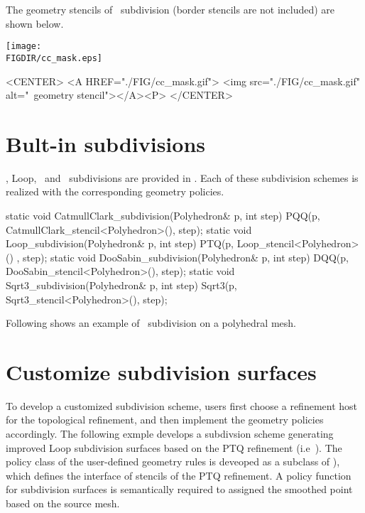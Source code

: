 The geometry stencils of \CC\ subdivision (border stencils are 
not included) are shown below. 

\begin{ccTexOnly}
  \begin{center}
    \parbox{0.4\textwidth}{%
      \texttt{[image: \\FIGDIR/cc\_mask.eps]}%
    }
  \end{center}
\end{ccTexOnly}

\begin{ccHtmlOnly}
  <CENTER>
  <A HREF="./FIG/cc_mask.gif">
     <img src="./FIG/cc_mask.gif" alt="\CC\ geometry stencil"></A><P>
  </CENTER>
\end{ccHtmlOnly}


\section{Bult-in subdivisions}
\CC , Loop, \DS\ and \ subdivisions are provided in . Each of these 
subdivision schemes is realized with the corresponding geometry policies.
\begin{ccExampleCode}
  static void CatmullClark_subdivision(Polyhedron& p, int step) {
    PQQ(p, CatmullClark_stencil<Polyhedron>(), step);
  }
  static void Loop_subdivision(Polyhedron& p, int step) {
    PTQ(p, Loop_stencil<Polyhedron>() , step);
  }
  static void DooSabin_subdivision(Polyhedron& p, int step) {
    DQQ(p, DooSabin_stencil<Polyhedron>(), step);
  }
  static void Sqrt3_subdivision(Polyhedron& p, int step) {
    Sqrt3(p, Sqrt3_stencil<Polyhedron>(), step);
  }
\end{ccExampleCode}

Following shows an example of \DS\ subdivision on a polyhedral mesh.

\section{Customize subdivision surfaces}
To develop a customized subdivision scheme, users first choose a 
refinement host for the topological refinement, and then implement 
the geometry policies accordingly. 
The following exmple develops a subdivsion scheme
generating improved Loop subdivision surfaces based on the PTQ refinement 
(i.e~). The policy class of
the user-defined geometry rules is deveoped as a subclass 
of ), which defines the interface of stencils
of the PTQ refinement. A policy function for subdivision 
surfaces is semantically required to assigned the smoothed point 
based on the source mesh. 

